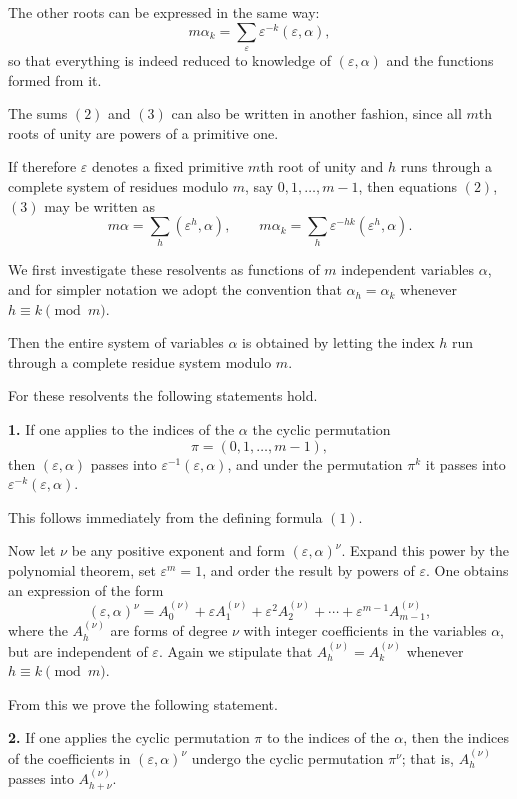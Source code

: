 \documentclass[11pt,a4paper]{book}
\begin{document}
The other roots can be expressed in the same way:
\[
m\alpha_k=\sum_{\varepsilon}\varepsilon^{-k}(\varepsilon,\alpha),
\tag{4}
\]
so that everything is indeed reduced to knowledge of $(\varepsilon,\alpha)$ and the functions formed from it.

The sums \((2)\) and \((3)\) can also be written in another fashion, since all $m$th roots of unity are powers of a primitive one.

If therefore $\varepsilon$ denotes a fixed primitive $m$th root of unity and $h$ runs through a complete system of residues modulo $m$, say $0,1,\dots,m-1$, then equations \((2)\), \((3)\) may be written as
\[
m\alpha=\sum_h (\varepsilon^h,\alpha),\qquad
m\alpha_k=\sum_h \varepsilon^{-hk}(\varepsilon^h,\alpha).
\tag{5}
\]

We first investigate these resolvents as functions of $m$ independent variables $\alpha$, and for simpler notation we adopt the convention that $\alpha_h=\alpha_k$ whenever $h\equiv k\pmod m$.

Then the entire system of variables $\alpha$ is obtained by letting the index $h$ run through a complete residue system modulo $m$.

For these resolvents the following statements hold.

\medskip
\noindent\textbf{1.}
If one applies to the indices of the $\alpha$ the cyclic permutation
\[
\pi=(0,1,\dots,m-1),
\]
then $(\varepsilon,\alpha)$ passes into $\varepsilon^{-1}(\varepsilon,\alpha)$, and under the permutation $\pi^k$ it passes into $\varepsilon^{-k}(\varepsilon,\alpha)$.

\medskip
This follows immediately from the defining formula \((1)\).

Now let $\nu$ be any positive exponent and form $(\varepsilon,\alpha)^\nu$. Expand this power by the polynomial theorem, set $\varepsilon^m=1$, and order the result by powers of $\varepsilon$. One obtains an expression of the form
\[
(\varepsilon,\alpha)^\nu
=
A^{(\nu)}_0+\varepsilon A^{(\nu)}_1+\varepsilon^2A^{(\nu)}_2+\cdots+\varepsilon^{m-1}A^{(\nu)}_{m-1},
\tag{5'}
\]
where the $A^{(\nu)}_h$ are forms of degree $\nu$ with integer coefficients in the variables $\alpha$, but are independent of $\varepsilon$.
Again we stipulate that $A^{(\nu)}_h=A^{(\nu)}_k$ whenever $h\equiv k\pmod m$.

From this we prove the following statement.

\medskip
\noindent\textbf{2.}
If one applies the cyclic permutation $\pi$ to the indices of the $\alpha$, then the indices of the coefficients in $(\varepsilon,\alpha)^\nu$ undergo the cyclic permutation $\pi^\nu$; that is, $A^{(\nu)}_h$ passes into $A^{(\nu)}_{h+\nu}$.
\end{document}

